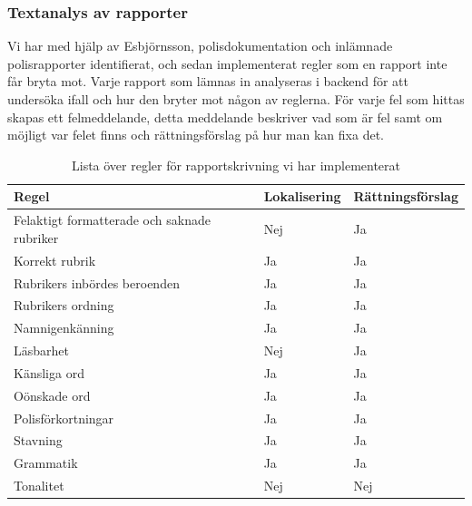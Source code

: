 \documentclass[swedish]{maucsthesis}
\begin{document}
\subsubsection{Textanalys av rapporter}

Vi har med hjälp av Esbjörnsson, polisdokumentation och inlämnade polisrapporter identifierat, och sedan implementerat
regler som en rapport inte får bryta mot. Varje rapport som lämnas in analyseras i backend för att undersöka
ifall och hur den bryter mot någon av reglerna.
För varje fel som hittas skapas ett felmeddelande, detta meddelande beskriver vad som är fel
samt om möjligt var felet finns och rättningsförslag på hur man kan fixa det.

\begin{table}[H]
\centering
\begin{tabular}{|l|l|l|}
\hline
Regel                                       & Lokalisering & Rättningsförslag\\ \hline
Felaktigt formatterade och saknade rubriker & Nej          & Ja               \\ \hline
Korrekt rubrik                              & Ja           & Ja               \\ \hline
Rubrikers inbördes beroenden                 & Ja           & Ja               \\ \hline
Rubrikers ordning                           & Ja           & Ja               \\ \hline
Namnigenkänning                             & Ja           & Ja               \\ \hline
Läsbarhet                                   & Nej          & Ja               \\ \hline
Känsliga ord                                & Ja           & Ja               \\ \hline
Oönskade ord                                & Ja           & Ja               \\ \hline
Polisförkortningar                          & Ja           & Ja               \\ \hline
Stavning                                    & Ja           & Ja               \\ \hline
Grammatik                                   & Ja           & Ja               \\ \hline
Tonalitet                                   & Nej          & Nej              \\ \hline
\end{tabular}
\caption{Lista över regler för rapportskrivning vi har implementerat}
\label{rulestable}
\end{table}
\end{document}
